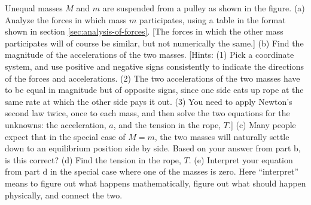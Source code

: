 Unequal masses $M$ and $m$ are suspended from a pulley
as shown in the figure.\hwendpart
(a) Analyze the forces in which mass $m$ participates, using
a table in the format shown in section \ref{sec:analysis-of-forces}. [The forces in
which the other mass participates will of course be similar,
but not numerically the same.]\hwendpart
(b) Find the magnitude of the accelerations of the two
masses. [Hints: (1) Pick a coordinate system, and use
positive and negative signs consistently to indicate the
directions of the forces and accelerations. (2) The two
accelerations of the two masses have to be equal in
magnitude but of opposite signs, since one side eats up rope
at the same rate at which the other side pays it out. (3)
You need to apply Newton's second law twice, once to each
mass, and then solve the two equations for the unknowns: the
acceleration, $a$, and the tension in the rope, $T$.] \answercheck\hwendpart
(c) Many people expect that in the special case of $M=m$,
the two masses will naturally settle down to an equilibrium
position side by side. Based on your answer from part b,
is this correct? \hwendpart
(d) Find the tension in the rope, $T$.\answercheck\hwendpart
(e) Interpret your equation from part d in the special case where
one of the masses is zero. Here ``interpret'' means to figure out
what happens mathematically, figure out what should happen
physically, and connect the two.\hwendpart
